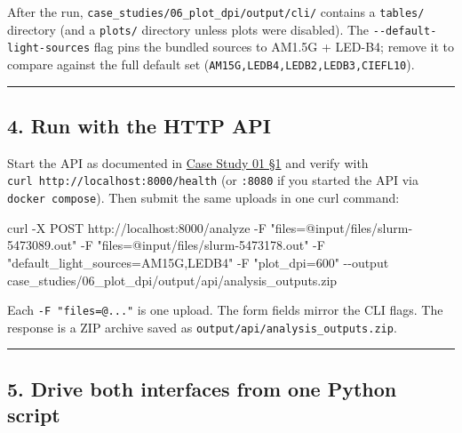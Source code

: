 \documentclass[
  11pt,
]{article}
\newenvironment{Shaded}{}{}
\newcommand{\AttributeTok}[1]{\textcolor[rgb]{0.49,0.56,0.16}{#1}}
\newcommand{\ExtensionTok}[1]{#1}
\newcommand{\NormalTok}[1]{#1}
\newcommand{\StringTok}[1]{\textcolor[rgb]{0.25,0.44,0.63}{#1}}
\begin{document}
After the run, \texttt{case\_studies/06\_plot\_dpi/output/cli/} contains
a \texttt{tables/} directory (and a \texttt{plots/} directory unless
plots were disabled). The \texttt{-\/-default-light-sources} flag pins
the bundled sources to AM1.5G + LED-B4; remove it to compare against the
full default set (\texttt{AM15G,LEDB4,LEDB2,LEDB3,CIEFL10}).

\begin{center}\rule{0.5\linewidth}{0.5pt}\end{center}

\hypertarget{4-run-with-the-http-api}{
\subsection{4. Run with the HTTP API}\label{4-run-with-the-http-api}}

Start the API as documented in
\href{https://github.com/pinarsyt/overlap-calculator/blob/main/case_studies/01_theoretical_only/README.md\#1-prerequisites}{Case
Study 01 §1} and verify with
\texttt{curl\ http://localhost:8000/health} (or \texttt{:8080} if you
started the API via \texttt{docker\ compose}). Then submit the same
uploads in one curl command:

\begin{Shaded}
\begin{Highlighting}[]
\ExtensionTok{curl} \AttributeTok{{-}X}\NormalTok{ POST http://localhost:8000/analyze }\AttributeTok{{-}F} \StringTok{"files=@input/files/slurm{-}5473089.out"} \AttributeTok{{-}F} \StringTok{"files=@input/files/slurm{-}5473178.out"} \AttributeTok{{-}F} \StringTok{"default\_light\_sources=AM15G,LEDB4"} \AttributeTok{{-}F} \StringTok{"plot\_dpi=600"} \AttributeTok{{-}{-}output}\NormalTok{ case\_studies/06\_plot\_dpi/output/api/analysis\_outputs.zip}
\end{Highlighting}
\end{Shaded}

Each \texttt{-F\ "files=@..."} is one upload. The form fields mirror the
CLI flags. The response is a ZIP archive saved as
\texttt{output/api/analysis\_outputs.zip}.

\begin{center}\rule{0.5\linewidth}{0.5pt}\end{center}

\hypertarget{5-drive-both-interfaces-from-one-python-script}{
\subsection{5. Drive both interfaces from one Python
script}\label{5-drive-both-interfaces-from-one-python-script}}
\end{document}
